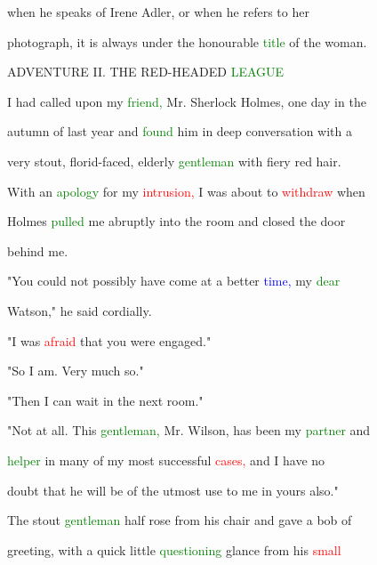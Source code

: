  when he speaks of Irene Adler, or when he refers to her

 photograph, it is always under the honourable \textcolor{green}{title} of the woman.







 \textcolor{BurntOrange}{ADVENTURE} II. THE RED-HEADED \textcolor{green}{LEAGUE}



 I had called upon my \textcolor{green}{friend,} Mr. Sherlock Holmes, one day in the

 autumn of last year and \textcolor{green}{found} him in deep conversation with a

 very stout, florid-faced, elderly \textcolor{green}{gentleman} with fiery red hair.

 With an \textcolor{green}{apology} for my \textcolor{red}{intrusion,} I was about to \textcolor{red}{withdraw} when

 Holmes \textcolor{green}{pulled} me abruptly into the room and closed the door

 behind me.



 "You could not possibly have come at a better \textcolor{blue}{time,} my \textcolor{green}{dear}

 Watson," he said cordially.



 "I was \textcolor{red}{afraid} that you were engaged."



 "So I am. Very much so."



 "Then I can \textcolor{BurntOrange}{wait} in the next room."



 "Not at all. This \textcolor{green}{gentleman,} Mr. Wilson, has been my \textcolor{green}{partner} and

 \textcolor{green}{helper} in many of my most \textcolor{BurntOrange}{successful} \textcolor{red}{cases,} and I have no

 \textcolor{BurntOrange}{doubt} that he will be of the utmost use to me in yours also."



 The stout \textcolor{green}{gentleman} half rose from his chair and gave a bob of

 greeting, with a quick little \textcolor{green}{questioning} glance from his \textcolor{red}{small}

